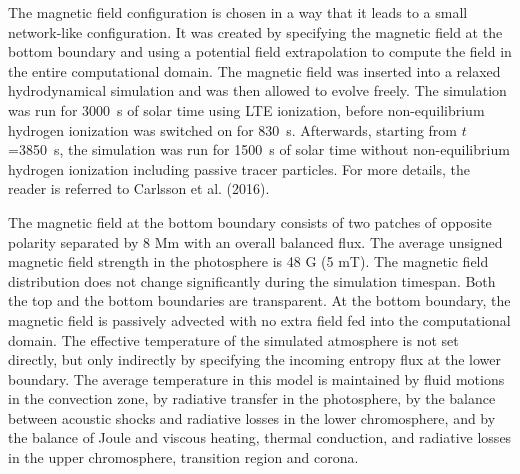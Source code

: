 \documentclass{aa}
\begin{document}
The magnetic field configuration is chosen in a way that it leads to a small network-like configuration. It was created by specifying the magnetic field at the bottom boundary and using a potential field extrapolation to compute the field in the entire computational domain. The magnetic field was inserted into a relaxed hydrodynamical simulation and was then allowed to evolve freely. The simulation was run for 3000~s of solar time using LTE ionization, before non-equilibrium hydrogen ionization was switched on for 830~s. Afterwards, starting from $t$=3850~s, the simulation was run for 1500~s of solar time without non-equilibrium hydrogen ionization including passive tracer particles. For more details, the reader is referred to Carlsson et al. (2016).

The magnetic field at the bottom boundary consists of two patches of opposite polarity separated by 8 Mm with an overall balanced flux.
The average unsigned magnetic field strength in the photosphere is 48 G (5 mT). The magnetic field distribution does not change significantly during the simulation timespan.
Both the top and the bottom boundaries are transparent. At the bottom boundary, the magnetic field is passively advected with no extra field fed into the computational domain. The effective temperature of the simulated atmosphere is not set directly, but only indirectly by specifying the incoming entropy flux at the lower boundary. The average temperature in this model is maintained by fluid motions in the convection zone, by radiative transfer in the photosphere, by the balance between acoustic shocks and radiative losses in the lower chromosphere, and by the balance of Joule and viscous heating, thermal conduction, and radiative losses in the upper chromosphere, transition region and corona. 
\end{document}
